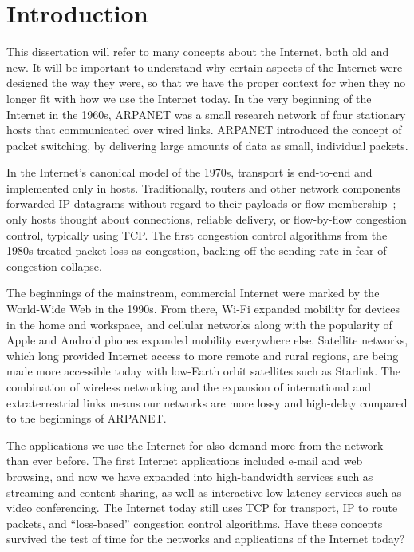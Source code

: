 \chapter{Introduction}
\label{sec:introduction}

This dissertation will refer to many concepts about the Internet, both old and
new. It will be important to understand why certain aspects of the Internet were
designed the way they were, so that we have the proper context for when they no
longer fit with how we use the Internet today. In the very beginning of the
Internet in the 1960s, ARPANET was a small research network of four stationary
hosts that communicated over wired links. ARPANET introduced the concept of
packet switching, by delivering large amounts of data as small, individual
packets.

In the Internet's canonical model of the 1970s, transport is end-to-end and
implemented only in hosts. Traditionally, routers and other network components
forwarded IP datagrams without regard to their payloads or flow
membership~\cite{saltzer1984endtoend, clark1988darpa}; only hosts thought about
connections, reliable delivery, or flow-by-flow congestion control, typically
using TCP. The first congestion control algorithms from the 1980s treated
packet loss as congestion, backing off the sending rate in fear of congestion
collapse.

The beginnings of the mainstream, commercial Internet were marked by the
World-Wide Web in the 1990s. From there, Wi-Fi expanded mobility for devices in
the home and workspace, and cellular networks along with the popularity of
Apple and Android phones expanded mobility everywhere else. Satellite networks,
which long provided Internet access to more remote and rural regions, are being
made more accessible today with low-Earth orbit satellites such as Starlink.
The combination of wireless networking and the expansion of international and
extraterrestrial links means our networks are more lossy and high-delay
compared to the beginnings of ARPANET.

The applications we use the Internet for also demand more from the network than
ever before. The first Internet applications included e-mail and web browsing,
and now we have expanded into high-bandwidth services such as streaming and
content sharing, as well as interactive low-latency services such as video
conferencing. The Internet today still uses TCP for transport, IP to route
packets, and ``loss-based'' congestion control algorithms. Have these concepts
survived the test of time for the networks and applications of the Internet
today?

